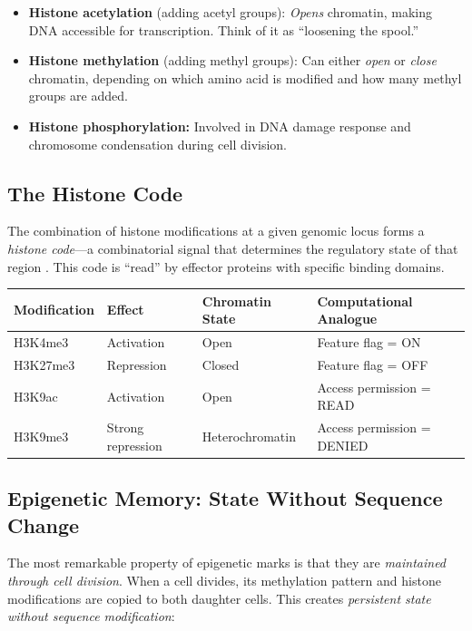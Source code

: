 \begin{itemize}[leftmargin=1.8em]
  \item \textbf{Histone acetylation} (adding acetyl groups): \emph{Opens} chromatin, making DNA accessible for transcription. Think of it as ``loosening the spool.''
  \item \textbf{Histone methylation} (adding methyl groups): Can either \emph{open} or \emph{close} chromatin, depending on which amino acid is modified and how many methyl groups are added.
  \item \textbf{Histone phosphorylation:} Involved in DNA damage response and chromosome condensation during cell division.
\end{itemize}

\subsection{The Histone Code}

The combination of histone modifications at a given genomic locus forms a \emph{histone code}---a combinatorial signal that determines the regulatory state of that region \citep{allis2016}. This code is ``read'' by effector proteins with specific binding domains.

\begin{center}
\renewcommand{\arraystretch}{1.15}
\begin{tabularx}{0.95\textwidth}{L{3cm} L{2.5cm} L{3cm} Y}
\toprule
\textbf{Modification} & \textbf{Effect} & \textbf{Chromatin State} & \textbf{Computational Analogue} \\
\midrule
H3K4me3 & Activation & Open & Feature flag = ON \\
H3K27me3 & Repression & Closed & Feature flag = OFF \\
H3K9ac & Activation & Open & Access permission = READ \\
H3K9me3 & Strong repression & Heterochromatin & Access permission = DENIED \\
\bottomrule
\end{tabularx}
\end{center}

\subsection{Epigenetic Memory: State Without Sequence Change}

The most remarkable property of epigenetic marks is that they are \emph{maintained through cell division}. When a cell divides, its methylation pattern and histone modifications are copied to both daughter cells. This creates \emph{persistent state without sequence modification}:


